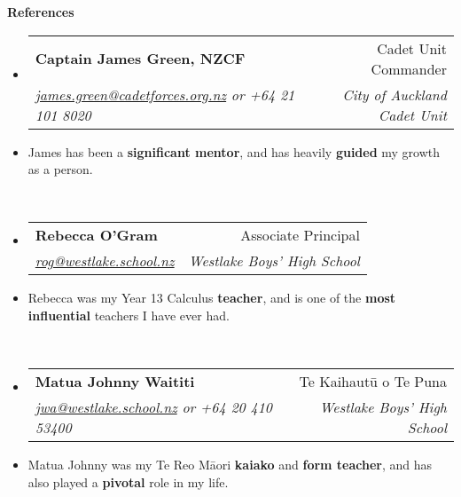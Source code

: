 \documentclass[11pt,a4paper]{article}[leftmargin=*]
\makeatletter
\def \entryspacing {-0pt}
\renewcommand{\section}[2]{\vspace{5pt}
  \colorbox{secondary}{\color{white}\raggedbottom\normalsize\textbf{{#1}{\hspace{2pt}#2\hspace{4pt}}}}
}
\newcommand{\resumeEntryStart}{\begin{itemize}[leftmargin=2.5mm]}
\newcommand{\resumeEntryEnd}{\end{itemize}\vspace{\entryspacing}}
\newcommand{\resumeEntryTSDL}[4]{
  \vspace{-1pt}\item[]
    \begin{tabularx}{0.97\textwidth}{X@{\hspace{60pt}}r}
      \textbf{\color{primary}#1} & {\firabook\color{accent}\small#2} \\
      \textit{\color{accent}\small#3} & \textit{\color{accent}\small#4} \\
    \end{tabularx}\vspace{-6pt}
}
\newcommand{\resumeEntryP}[1]{
  \item[]\small{
    #1 \vspace{-4pt}
  }\\
}
\newcommand{\resumeBf}[1]{\small\textbf{\color{halfbold}#1}}
\makeatother
\begin{document}

\section{\faUserCheck}{References}

\resumeEntryStart
\resumeEntryTSDL
{Captain James Green, NZCF}{Cadet Unit Commander}
{\href{mailto:james.green@cadetforces.org.nz}{james.green@cadetforces.org.nz} or +64 21 101 8020}{City of Auckland Cadet Unit}

\resumeEntryP{
  James has been a \resumeBf{significant mentor}, and has heavily \resumeBf{guided} my growth as a person.
}
\resumeEntryEnd

\resumeEntryStart
\resumeEntryTSDL
{Rebecca O'Gram}{Associate Principal}
{\href{mailto:rog@westlake.school.nz}{rog@westlake.school.nz}}{Westlake Boys' High School}

\resumeEntryP{
  Rebecca was my Year 13 Calculus \resumeBf{teacher}, and is one of the \resumeBf{most influential} teachers I have ever had.
}
\resumeEntryEnd

\resumeEntryStart
\resumeEntryTSDL
{Matua Johnny Waititi}{Te Kaihautū o Te Puna}
{\href{mailto:jwa@westlake.school.nz}{jwa@westlake.school.nz} or +64 20 410 53400}{Westlake Boys' High School}

\resumeEntryP{
  Matua Johnny was my Te Reo Māori \resumeBf{kaiako} and \resumeBf{form teacher}, and has also played a \resumeBf{pivotal} role in my life.
}
\resumeEntryEnd
\end{document}

